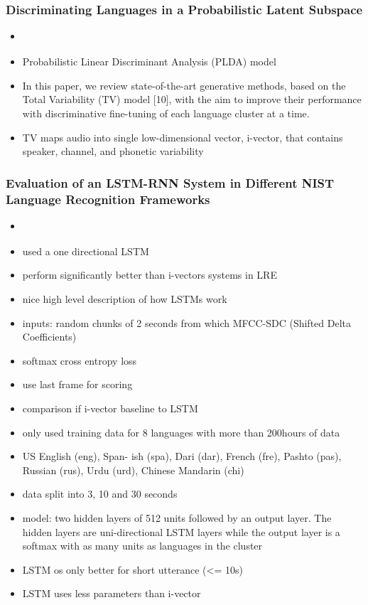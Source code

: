     \subsubsection{Discriminating Languages in a Probabilistic Latent Subspace}
    \begin{itemize}
        \item \cite{sizovdiscriminating}
        \item Probabilistic Linear Discriminant Analysis (PLDA) model
        \item In this paper, we review state-of-the-art generative methods, based on the Total Variability (TV) model [10], with the aim to improve their performance with discriminative fine-tuning of each language cluster at a time.
        \item TV maps audio into single low-dimensional vector, i-vector, that contains speaker, channel, and phonetic variability
        
    \end{itemize}
    
    \subsubsection{Evaluation of an LSTM-RNN System in Different NIST Language Recognition Frameworks}
    \begin{itemize}
        \item \cite{zazo2016evaluation}
        \item used a one directional LSTM
        \item perform significantly better than i-vectors systems in LRE
        \item nice high level description of how LSTMs work
        \item inputs: random chunks of 2 seconds from which MFCC-SDC (Shifted Delta Coefficients) 
        \item softmax cross entropy loss
        \item use last frame for scoring
        \item comparison if i-vector baseline to LSTM
        \item only used training data for 8 languages with more than 200hours of data
        \item US English (eng), Span- ish (spa), Dari (dar), French (fre), Pashto (pas), Russian (rus), Urdu (urd), Chinese Mandarin (chi)
        \item data split into 3, 10 and 30 seconds
        \item model: two hidden layers of 512 units followed by an output layer. The hidden layers are uni-directional LSTM layers while the output layer is a softmax with as many units as languages in the cluster
        \item LSTM os only better for short utterance (<= 10s)
        \item LSTM uses less parameters than i-vector
        
    \end{itemize}
    

